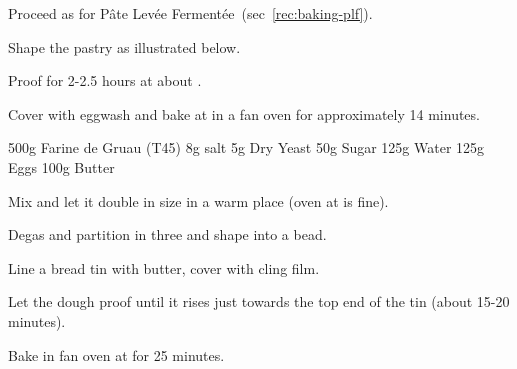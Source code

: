 \begin{method}[]
Proceed as for P\^ate Lev\'ee Ferment\'ee~(sec~\ref{rec:baking-plf}).

Shape the pastry as illustrated below.

Proof for 2-2.5 hours at about .

Cover with eggwash and bake at  in a fan oven for approximately 14 minutes.





\end {method}

\label{rec:bread-brioche}

\begin{ingreds}
	500g Farine de Gruau (T45)
	8g salt
	5g Dry Yeast
	50g Sugar
	125g Water
	125g Eggs
	100g Butter
\end{ingreds}

\begin{method}[]
	Mix and let it double in size in a warm place (oven at  is fine).

	Degas and partition in three and shape into a bead.

	Line a bread tin with butter, cover with cling film.
	
	Let the dough proof until it rises just towards the top end of the tin (about 15-20 minutes).

	Bake in fan oven at  for 25 minutes.

\end{method}


